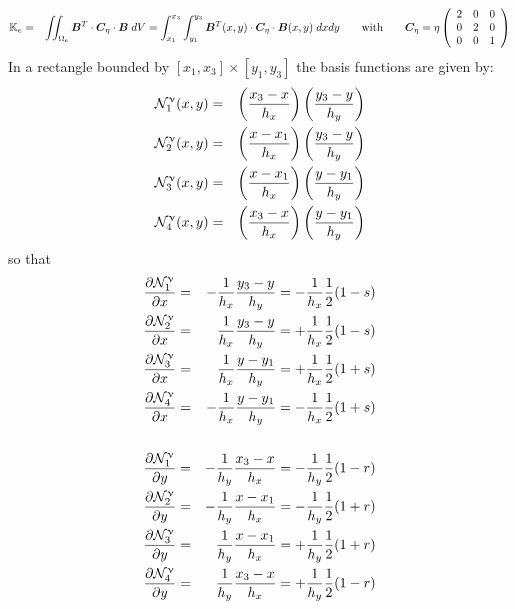 \begin{eqnarray}
{\mathbb{K}}_e 
&=& \iint_{\Omega_e} {\bm B}^T \cdot {\bm C}_\eta \cdot {\bm B} \; dV 
= \int_{x_1}^{x_3}\int_{y_1}^{y_3} 
{\bm B}^T(x,y) \cdot {\bm C}_\eta \cdot {\bm B}(x,y) \; dx dy 
\qquad\text{with}\qquad 
{\bm C}_\eta = \eta \left(\begin{array}{ccc}
2 &0 &0\\
0 &2 &0\\
0 &0 &1 
\end{array}\right) \nonumber
\end{eqnarray}
In a rectangle bounded by $[x_1,x_3]\times[y_1,y_3]$ the basis functions are given by:
\begin{eqnarray}
{{\mathcal{N}}}_1^\upnu(x,y) &=& \left( \frac{x_3 -x }{h_x}  \right) \left( \frac{y_3 -y }{h_y}  \right) \nonumber\\
{{\mathcal{N}}}_2^\upnu(x,y) &=& \left( \frac{x - x_1}{h_x}  \right) \left( \frac{y_3 -y }{h_y}  \right) \nonumber\\
{{\mathcal{N}}}_3^\upnu(x,y) &=& \left( \frac{x - x_1}{h_x}  \right) \left( \frac{y - y_1}{h_y}  \right) \nonumber\\
{{\mathcal{N}}}_4^\upnu(x,y) &=& \left( \frac{x_3 -x }{h_x}  \right) \left( \frac{y - y_1}{h_y}  \right) \nonumber 
\end{eqnarray}
so that 
\begin{eqnarray}
\frac{\partial {\mathcal{N}}_1^\upnu}{\partial x} &=&-\frac{1}{h_x}\frac{y_3-y}{h_y}=-\frac{1}{h_x}\frac12 (1-s)\nonumber\\
\frac{\partial {\mathcal{N}}_2^\upnu}{\partial x} &=& \frac{1}{h_x}\frac{y_3-y}{h_y}=+\frac{1}{h_x}\frac12 (1-s)\nonumber\\
\frac{\partial {\mathcal{N}}_3^\upnu}{\partial x} &=& \frac{1}{h_x}\frac{y-y_1}{h_y}=+\frac{1}{h_x}\frac12 (1+s)\nonumber\\
\frac{\partial {\mathcal{N}}_4^\upnu}{\partial x} &=&-\frac{1}{h_x}\frac{y-y_1}{h_y}=-\frac{1}{h_x}\frac12 (1+s)\nonumber\\
\nonumber\\
\frac{\partial {\mathcal{N}}_1^\upnu}{\partial y} &=&-\frac{1}{h_y}\frac{x_3-x}{h_x}=-\frac{1}{h_y}\frac12 (1-r)\nonumber\\
\frac{\partial {\mathcal{N}}_2^\upnu}{\partial y} &=&-\frac{1}{h_y}\frac{x-x_1}{h_x}=-\frac{1}{h_y}\frac12 (1+r)\nonumber\\
\frac{\partial {\mathcal{N}}_3^\upnu}{\partial y} &=& \frac{1}{h_y}\frac{x-x_1}{h_x}=+\frac{1}{h_y}\frac12 (1+r)\nonumber\\
\frac{\partial {\mathcal{N}}_4^\upnu}{\partial y} &=& \frac{1}{h_y}\frac{x_3-x}{h_x}=+\frac{1}{h_y}\frac12 (1-r)
\nonumber
\end{eqnarray}
